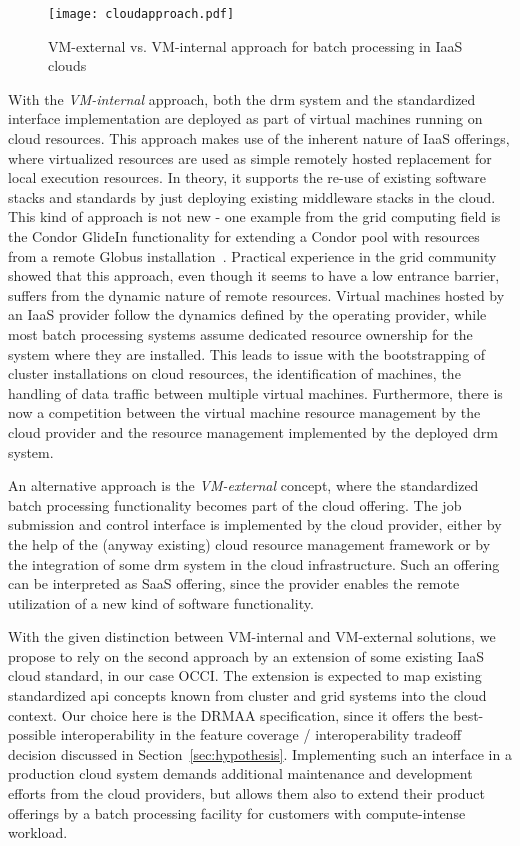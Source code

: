 \documentclass[twocolumn]{svjour3}       %
\begin{document}
\begin{figure}
  \texttt{[image: cloudapproach.pdf]}
\caption{VM-external vs. VM-internal approach for batch processing in IaaS clouds}
\label{fig:vmapproach} 
\end{figure}


With the \emph{VM-internal} approach, both the \gls{drm} system and the standardized interface implementation are deployed as part of virtual machines running on cloud resources. This approach makes use of the inherent nature of IaaS offerings, where virtualized resources are used as simple remotely hosted replacement for local execution resources. In theory, it supports the re-use of existing software stacks and standards by just deploying existing middleware stacks in the cloud. This kind of approach is not new - one example from the grid computing field is the Condor GlideIn functionality for extending a Condor pool with resources from a remote Globus installation~\cite{condorgrid}. Practical experience in the grid community showed that this approach, even though it seems to have a low entrance barrier, suffers from the dynamic nature of remote resources. Virtual machines hosted by an IaaS provider follow the dynamics defined by the operating provider, while most batch processing systems assume dedicated resource ownership for the system where they are installed. This leads to issue with the bootstrapping of cluster installations on cloud resources, the identification of machines, the handling of data traffic between multiple virtual machines. Furthermore, there is now a competition between the virtual machine resource management by the cloud provider and the resource management implemented by the deployed \gls{drm} system.

An alternative approach is the \emph{VM-external} concept, where the standardized batch processing functionality becomes part of the cloud offering. The job submission and control interface is implemented by the cloud provider, either by the help of the (anyway existing) cloud resource management framework or by the integration of some \gls{drm} system in the cloud infrastructure. Such an offering can be interpreted as SaaS offering, since the provider enables the remote utilization of a new kind of software functionality.

With the given distinction between VM-internal and VM-external solutions, we propose to rely on the second approach by an extension of some existing IaaS cloud standard, in our case OCCI. The extension is expected to map existing standardized \gls{api} concepts known from cluster and grid systems into the cloud context. Our choice here is the DRMAA specification, since it offers the best-possible interoperability in the feature coverage / interoperability tradeoff decision discussed in Section~\ref{sec:hypothesis}. Implementing such an interface in a production cloud system demands additional maintenance and development efforts from the cloud providers, but allows them also to extend their product offerings by a batch processing facility for customers with compute-intense workload.
\end{document}
